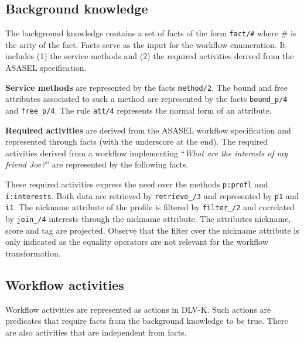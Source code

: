 \subsection{Background knowledge} \label{subsec:kb}
The background knowledge contains a set of facts of the form \texttt{fact/\#} where \#{} is the arity of the fact. Facts serve as the input for the workflow enumeration. It includes (1) the service methods and (2) the required activities derived from the ASASEL specification.

\vspace*{0.25cm}
\noindent               
\textbf{Service methods} are represented by the facts \texttt{method/2}. The bound and free attributes associated to such a method are represented by the facts \texttt{bound_p/4} and \texttt{free_p/4}. The rule \texttt{att/4} represents the normal form of an attribute.

%


\vspace*{0.25cm}
\textbf{Required activities} are derived from the ASASEL workflow specification and represented through facts (with the underscore at the end). The required activities derived from a workflow implementing ``\textit{What are the interests of my friend Joe?}'' are represented by the following facts. 

%


\vspace*{0.25cm}
These required activities express the need over the methods \texttt{p:profl} and\\\texttt{i:interests}. Both data are retrieved by \texttt{retrieve\_/3} and represented by \texttt{p1} and \texttt{i1}. The nickname attribute of the profile is filtered by \texttt{filter\_/2} and correlated by \texttt{join\_/4} interests through the nickname attribute. The attributes nickname, score and tag are projected. Observe that the filter over the nickname attribute is only indicated as the equality operators are not relevant for the workflow transformation.

\subsection{Workflow activities}
Workflow activities are represented as actions in DLV-K. Such actions are predicates that require facts from the background knowledge to be true. There are also activities that are independent from facts.


